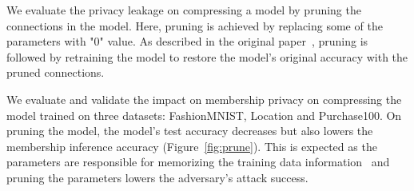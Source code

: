 We evaluate the privacy leakage on compressing a model by pruning the connections in the model.
Here, pruning is achieved by replacing some of the parameters with "0" value.
As described in the original paper~\cite{Han:2015:LBW:2969239.2969366,DBLP:journals/corr/HanPNMTECTD16}, pruning is followed by retraining the model to restore the model's original accuracy with the pruned connections.

We evaluate and validate the impact on membership privacy on compressing the model trained on three datasets: FashionMNIST, Location and Purchase100.
On pruning the model, the model's test accuracy decreases but also lowers the membership inference accuracy (Figure~\ref{fig:prune}).
This is expected as the parameters are responsible for memorizing the training data information~\cite{DBLP:journals/corr/abs-1812-00910,236216,10.1145/3133956.3134077} and pruning the parameters lowers the adversary's attack success.

